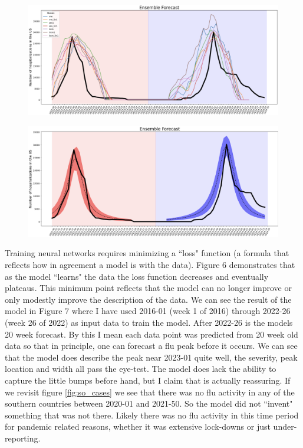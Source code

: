 \documentclass[12pt,a4paper,english]{article}
\begin{document}
\begin{figure}[h!]
		\begin{center}
		\includegraphics[scale=0.45]{Pictures/modelvariationzoom.png}
		\caption{}
		\end{center}
		\label{fig:f}
	\end{figure}
\FloatBarrier

\begin{figure}[h!]
		\begin{center}
		\includegraphics[scale=0.7]{Pictures/lorenzians.png}
		\caption{}
		\end{center}
		\label{fig:f_shade}
	\end{figure}
\FloatBarrier


Training neural networks requires minimizing a ``loss" function (a formula that reflects how in agreement a model is with the data). Figure 6 demonstrates that as the model ``learns" the data the loss function decreases and eventually plateaus. This minimum point reflects that the model can no longer improve or only modestly improve the description of the data. We can see the result of the model in Figure 7 where I have used 2016-01 (week 1 of 2016) through 2022-26 (week 26 of 2022) as input data to train the model. After 2022-26 is the models 20 week forecast. By this I mean each data point was predicted from 20 week old data so that in principle, one can forecast a flu peak before it occurs. We can see that the model does describe the peak near 2023-01 quite well, the severity, peak location and width all pass the eye-test. The model does lack the ability to capture the little bumps before hand, but I claim that is actually reassuring. If we revisit figure \ref{fig:so_cases} we see that there was no flu activity in any of the southern countries between 2020-01 and 2021-50. So the model did not ``invent" something that was not there. Likely there was no flu activity in this time period for pandemic related reasons, whether it was extensive lock-downs or just under-reporting.
\end{document}
